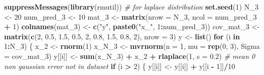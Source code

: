 \documentclass[
]{article}
\newenvironment{Shaded}{\begin{snugshade}}{\end{snugshade}}
\newcommand{\CommentTok}[1]{\textcolor[rgb]{0.56,0.35,0.01}{\textit{#1}}}
\newcommand{\ControlFlowTok}[1]{\textcolor[rgb]{0.13,0.29,0.53}{\textbf{#1}}}
\newcommand{\DataTypeTok}[1]{\textcolor[rgb]{0.13,0.29,0.53}{#1}}
\newcommand{\DecValTok}[1]{\textcolor[rgb]{0.00,0.00,0.81}{#1}}
\newcommand{\FloatTok}[1]{\textcolor[rgb]{0.00,0.00,0.81}{#1}}
\newcommand{\KeywordTok}[1]{\textcolor[rgb]{0.13,0.29,0.53}{\textbf{#1}}}
\newcommand{\NormalTok}[1]{#1}
\newcommand{\OperatorTok}[1]{\textcolor[rgb]{0.81,0.36,0.00}{\textbf{#1}}}
\newcommand{\StringTok}[1]{\textcolor[rgb]{0.31,0.60,0.02}{#1}}
\begin{document}
\begin{Shaded}
\begin{Highlighting}[]
\KeywordTok{suppressMessages}\NormalTok{(}\KeywordTok{library}\NormalTok{(rmutil))  }\CommentTok{# for laplace distribution}
\KeywordTok{set.seed}\NormalTok{(}\DecValTok{1}\NormalTok{)}
\NormalTok{N_}\DecValTok{3}\NormalTok{ <-}\StringTok{ }\DecValTok{20}
\NormalTok{num_pred_}\DecValTok{3}\NormalTok{ <-}\StringTok{ }\DecValTok{10}
\NormalTok{mat_}\DecValTok{3}\NormalTok{ <-}\StringTok{ }\KeywordTok{matrix}\NormalTok{(}\DataTypeTok{nrow =}\NormalTok{ N_}\DecValTok{3}\NormalTok{, }\DataTypeTok{ncol =}\NormalTok{ num_pred_}\DecValTok{3} \OperatorTok{+}\StringTok{ }\DecValTok{1}\NormalTok{)}
\KeywordTok{colnames}\NormalTok{(mat_}\DecValTok{3}\NormalTok{) <-}\StringTok{ }\KeywordTok{c}\NormalTok{(}\StringTok{"y"}\NormalTok{, }\KeywordTok{paste0}\NormalTok{(}\StringTok{"x_"}\NormalTok{, }\DecValTok{1}\OperatorTok{:}\NormalTok{num_pred_}\DecValTok{3}\NormalTok{))}
\NormalTok{cov_mat_}\DecValTok{3}\NormalTok{ <-}\StringTok{ }\KeywordTok{matrix}\NormalTok{(}\KeywordTok{c}\NormalTok{(}\DecValTok{2}\NormalTok{, }\FloatTok{0.5}\NormalTok{, }\FloatTok{1.5}\NormalTok{, }\FloatTok{0.5}\NormalTok{, }\DecValTok{2}\NormalTok{, }\FloatTok{0.8}\NormalTok{, }\FloatTok{1.5}\NormalTok{, }\FloatTok{0.8}\NormalTok{, }\DecValTok{2}\NormalTok{), }\DataTypeTok{nrow =} \DecValTok{3}\NormalTok{)}
\NormalTok{y <-}\StringTok{ }\KeywordTok{list}\NormalTok{()}
\ControlFlowTok{for}\NormalTok{ (i }\ControlFlowTok{in} \DecValTok{1}\OperatorTok{:}\NormalTok{N_}\DecValTok{3}\NormalTok{) \{}
\NormalTok{  x_}\DecValTok{2}\NormalTok{ <-}\StringTok{ }\KeywordTok{rnorm}\NormalTok{(}\DecValTok{1}\NormalTok{)}
\NormalTok{  x_N_}\DecValTok{3}\NormalTok{ <-}\StringTok{ }\KeywordTok{mvrnorm}\NormalTok{(}\DataTypeTok{n =} \DecValTok{1}\NormalTok{, }\DataTypeTok{mu =} \KeywordTok{rep}\NormalTok{(}\DecValTok{0}\NormalTok{, }\DecValTok{3}\NormalTok{), }\DataTypeTok{Sigma =}\NormalTok{ cov_mat_}\DecValTok{3}\NormalTok{)}
\NormalTok{  y[[i]] <-}\StringTok{ }\KeywordTok{sum}\NormalTok{(x_N_}\DecValTok{3}\NormalTok{) }\OperatorTok{+}
\StringTok{            }\NormalTok{x_}\DecValTok{2} \OperatorTok{+}
\StringTok{            }\KeywordTok{rlaplace}\NormalTok{(}\DecValTok{1}\NormalTok{, }\DataTypeTok{s =} \FloatTok{0.2}\NormalTok{) }\CommentTok{# mean 0 non gaussian error not in dataset}
  \ControlFlowTok{if}\NormalTok{ (i }\OperatorTok{>}\StringTok{ }\DecValTok{2}\NormalTok{) \{}
\NormalTok{    y[[i]] <-}\StringTok{ }\NormalTok{y[[i]] }\OperatorTok{+}\StringTok{ }\NormalTok{y[[i }\OperatorTok{-}\StringTok{ }\DecValTok{1}\NormalTok{]]}\OperatorTok{/}\DecValTok{10}

\end{Highlighting}
\end{Shaded}
\end{document}
